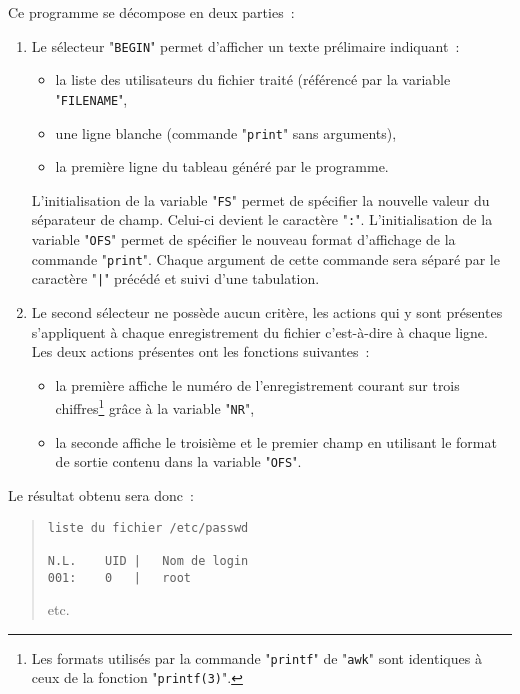 \begin{example}
Ce programme se d{\'e}compose en deux parties~:
\begin{enumerate}
	\item	Le s{\'e}lecteur "\texttt{BEGIN}" permet d'afficher un texte pr{\'e}limaire
			indiquant~:
			\begin{itemize}
				\item	la liste des utilisateurs du fichier trait{\'e} (r{\'e}f{\'e}renc{\'e} par la
						variable "\texttt{FILENAME}",
				\item	une ligne blanche (commande "\texttt{print}" sans arguments),
				\item	la premi{\`e}re ligne du tableau g{\'e}n{\'e}r{\'e} par le programme.
			\end{itemize}
			L'initialisation de la variable "\texttt{FS}" permet de sp{\'e}cifier la nouvelle
			valeur du s{\'e}parateur de champ. Celui-ci devient le caract{\`e}re "\texttt{:}".
			L'initialisation de la variable "\texttt{OFS}" permet de sp{\'e}cifier
			le nouveau format d'affichage de la commande "\texttt{print}". Chaque
			argument de cette commande sera s{\'e}par{\'e} par le caract{\`e}re "\verb=|="
			pr{\'e}c{\'e}d{\'e} et suivi d'une tabulation.\\[0.5cm]
	\item	Le second s{\'e}lecteur ne poss{\`e}de aucun crit{\`e}re, les actions qui y sont pr{\'e}sentes
			s'appliquent {\`a} chaque enregistrement du fichier c'est-{\`a}-dire {\`a} chaque
			ligne. Les deux actions pr{\'e}sentes ont les fonctions suivantes~:
			\begin{itemize}
				\item	la premi{\`e}re affiche le num{\'e}ro de l'enregistrement courant sur
						trois chiffres\footnote{Les formats utilis{\'e}s
						par la commande "\texttt{printf}" de "\texttt{awk}" sont
						identiques {\`a} ceux de la fonction "\texttt{printf(3)}".}
						gr{\^a}ce {\`a} la variable "\texttt{NR}",
				\item	la seconde affiche le troisi{\`e}me et le premier champ en utilisant
						le format de sortie contenu dans la variable "\texttt{OFS}".
			\end{itemize}
\end{enumerate}

Le r{\'e}sultat obtenu sera donc~:
\begin{quote}
\begin{verbatim}
liste du fichier /etc/passwd

N.L.	UID	|	Nom de login
001:	0	|	root
\end{verbatim}
etc.
\end{quote}
\end{example}


